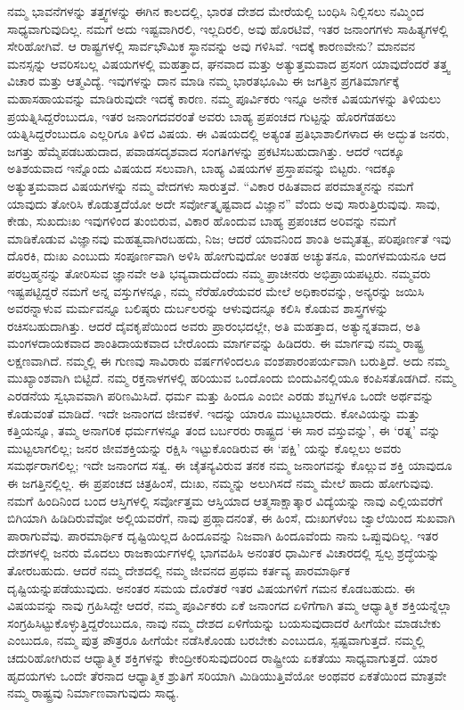 ನಮ್ಮ ಭಾವನೆಗಳನ್ನು ತತ್ತ್ವಗಳನ್ನು ಈಗಿನ ಕಾಲದಲ್ಲಿ, ಭಾರತ ದೇಶದ ಮೇರೆಯಲ್ಲಿ ಬಂಧಿಸಿ ನಿಲ್ಲಿಸಲು ನಮ್ಮಿಂದ ಸಾಧ್ಯವಾಗುವುದಿಲ್ಲ. ನಮಗೆ ಅದು ಇಷ್ಟವಾಗಿರಲಿ, ಇಲ್ಲದಿರಲಿ, ಅವು ಹೊರಟಿವೆ, ಇತರ ಜನಾಂಗಗಳು ಸಾಹಿತ್ಯಗಳಲ್ಲಿ ಸೇರಿಹೋಗಿವೆ. ಆ ರಾಷ್ಟ್ರಗಳಲ್ಲಿ ಸಾರ್ವಭೌಮಿಕ ಸ್ಥಾನವನ್ನು ಅವು ಗಳಿಸಿವೆ. ಇದಕ್ಕೆ ಕಾರಣವೇನು? ಮಾನವನ ಮನಸ್ಸನ್ನು ಆವರಿಸಬಲ್ಲ ವಿಷಯಗಳಲ್ಲಿ ಮಹತ್ತಾದ, ಘನವಾದ ಮತ್ತು ಅತ್ಯುತ್ತಮವಾದ ಪ್ರಸಂಗ ಯಾವುದೆಂದರೆ ತತ್ತ್ವ ವಿಚಾರ ಮತ್ತು ಆತ್ಮವಿದ್ಯೆ. ಇವುಗಳನ್ನು ದಾನ ಮಾಡಿ ನಮ್ಮ ಭಾರತಭೂಮಿ ಈ ಜಗತ್ತಿನ ಪ್ರಗತಿಮಾರ್ಗಕ್ಕೆ ಮಹಾಸಹಾಯವನ್ನು ಮಾಡಿರುವುದೇ ಇದಕ್ಕೆ ಕಾರಣ. ನಮ್ಮ ಪೂರ್ವಿಕರು ಇನ್ನೂ ಅನೇಕ ವಿಷಯಗಳನ್ನು ತಿಳಿಯಲು ಪ್ರಯತ್ನಿಸಿದ್ದರೆಂಬುದೂ, ಇತರ ಜನಾಂಗದವರಂತೆ ಅವರು ಬಾಹ್ಯ ಪ್ರಪಂಚದ ಗುಟ್ಟನ್ನು ಹೊರಗೆಡಹಲು ಯತ್ನಿಸಿದ್ದರೆಂಬುದೂ ಎಲ್ಲರಿಗೂ ತಿಳಿದ ವಿಷಯ. ಈ ವಿಷಯದಲ್ಲಿ ಅತ್ಯಂತ ಪ್ರತಿಭಾಶಾಲಿಗಳಾದ ಈ ಅದ್ಭುತ ಜನರು, ಜಗತ್ತು ಹೆಮ್ಮೆಪಡಬಹುದಾದ, ಪವಾಡ\break ಸದೃಶವಾದ ಸಂಗತಿಗಳನ್ನು ಪ್ರಕಟಿಸಬಹುದಾಗಿತ್ತು. ಆದರೆ ಇದಕ್ಕೂ ಅತಿಶಯವಾದ ಇನ್ನೊಂದು ವಿಷಯದ ಸಲುವಾಗಿ, ಬಾಹ್ಯ ವಿಷಯಗಳ ಪ್ರಸ್ತಾಪವನ್ನು ಬಿಟ್ಟರು. ಇದಕ್ಕೂ ಅತ್ಯುತ್ತಮವಾದ ವಿಷಯಗಳನ್ನು ನಮ್ಮ ವೇದಗಳು ಸಾರುತ್ತವೆ. “ವಿಕಾರ ರಹಿತವಾದ ಪರಮಾತ್ಮನನ್ನು ನಮಗೆ ಯಾವುದು ತೋರಿಸಿ ಕೊಡುತ್ತದೆಯೋ ಅದೇ ಸರ್ವೋತ್ಕೃಷ್ಟವಾದ ವಿಜ್ಞಾನ” ವೆಂದು ಅವು ಸಾರುತ್ತಿರುವುವು. ಸಾವು, ಕೇಡು, ಸುಖದುಃಖ ಇವುಗಳಿಂದ ತುಂಬಿರುವ, ವಿಕಾರ ಹೊಂದುವ ಬಾಹ್ಯ ಪ್ರಪಂಚದ ಅರಿವನ್ನು ನಮಗೆ ಮಾಡಿಕೊಡುವ ವಿಜ್ಞಾನವು ಮಹತ್ವವಾಗಿರಬಹದು, ನಿಜ; ಆದರೆ ಯಾವನಿಂದ ಶಾಂತಿ ಅಮೃತತ್ವ, ಪರಿಪೂರ್ಣತೆ ಇವು ದೊರಕಿ, ದುಃಖ ಎಂಬುದು ಸಂಪೂರ್ಣವಾಗಿ ಅಳಿಸಿ ಹೋಗುವುದೋ ಅಂತಹ ಅಚ್ಯುತನೂ, ಮಂಗಳಮಯನೂ ಆದ ಪರಬ್ರಹ್ಮನನ್ನು ತೋರಿಸುವ ಜ್ಞಾನವೇ ಅತಿ ಭವ್ಯವಾದುದೆಂದು ನಮ್ಮ ಪ್ರಾಚೀನರು ಅಭಿಪ್ರಾಯಪಟ್ಟರು. ನಮ್ಮವರು ಇಷ್ಟಪಟ್ಟಿದ್ದರೆ ನಮಗೆ ಅನ್ನ ವಸ್ತುಗಳನ್ನೂ, ನಮ್ಮ ನೆರೆಹೊರೆಯವರ ಮೇಲೆ ಅಧಿಕಾರವನ್ನು, ಅನ್ಯರನ್ನು ಜಯಿಸಿ ಅವರನ್ನಾಳುವ ಮರ್ಮವನ್ನೂ ಬಲಿಷ್ಠರು ದುರ್ಬಲರನ್ನು ಆಳುವುದನ್ನೂ ಕಲಿಸಿ ಕೊಡುವ ಶಾಸ್ತ್ರಗಳನ್ನು ರಚಿಸಬಹುದಾಗಿತ್ತು. ಆದರೆ ದೈವಕೃಪೆಯಿಂದ ಅವರು ಪ್ರಾರಂಭದಲ್ಲೇ, ಅತಿ ಮಹತ್ತಾದ, ಅತ್ಯುನ್ನತವಾದ, ಅತಿ ಮಂಗಳದಾಯಕವಾದ ಶಾಂತಿದಾಯಕವಾದ ಬೇರೊಂದು ಮಾರ್ಗವನ್ನು ಹಿಡಿದರು. ಈ ಮಾರ್ಗವು ನಮ್ಮ ರಾಷ್ಟ್ರ ಲಕ್ಷಣವಾಗಿದೆ. ನಮ್ಮಲ್ಲಿ ಈ ಗುಣವು ಸಾವಿರಾರು ವರ್ಷಗಳಿಂದಲೂ ವಂಶಪಾರಂಪರ್ಯವಾಗಿ ಬರುತ್ತಿದೆ. ಅದು ನಮ್ಮ ಮುಖ್ಯಾಂಶವಾಗಿ ಬಿಟ್ಟಿದೆ. ನಮ್ಮ ರಕ್ತನಾಳಗಳಲ್ಲಿ ಹರಿಯುವ ಒಂದೊಂದು ಬಿಂದುವಿನಲ್ಲಿಯೂ ಕಂಪಿಸತೊಡಗಿದೆ. ನಮ್ಮ ಎರಡನೆಯ ಸ್ವಭಾವವಾಗಿ ಪರಿಣಮಿಸಿದೆ. ಧರ್ಮ ಮತ್ತು ಹಿಂದೂ ಎಂಬೀ ಎರಡು ಶಬ್ದಗಳೂ ಒಂದೇ ಅರ್ಥವನ್ನು ಕೊಡುವಂತೆ ಮಾಡಿದೆ. ಇದೇ ಜನಾಂಗದ ಜೀವಕಳೆ. ಇದನ್ನು ಯಾರೂ ಮುಟ್ಟಬಾರದು. ಕೋವಿಯನ್ನು ಮತ್ತು ಕತ್ತಿಯನ್ನೂ, ತಮ್ಮ ಅನಾಗರಿಕ ಧರ್ಮಗಳನ್ನೂ ತಂದ ಬರ್ಬರರು ರಾಷ್ಟ್ರದ ‘ಈ ಸಾರ ವಸ್ತುವನ್ನು’, ಈ ‘ರತ್ನ’ ವನ್ನು ಮುಟ್ಟಲಾಗಲಿಲ್ಲ; ಜನರ ಜೀವಶಕ್ತಿಯನ್ನು ರಕ್ಷಿಸಿ ಇಟ್ಟುಕೊಂಡಿರುವ ಈ ‘ಪಕ್ಷಿ’ ಯನ್ನು ಕೊಲ್ಲಲು ಅವರು ಸಮರ್ಥರಾಗಲಿಲ್ಲ; ಇದೇ ಜನಾಂಗದ ಸತ್ವ. ಈ ಚೈತನ್ಯವಿರುವ ತನಕ ನಮ್ಮ ಜನಾಂಗವನ್ನು ಕೊಲ್ಲುವ ಶಕ್ತಿ ಯಾವುದೂ ಈ ಜಗತ್ತಿನಲ್ಲಿಲ್ಲ. ಈ ಪ್ರಪಂಚದ ಚಿತ್ರಹಿಂಸೆ, ದುಃಖ, ನಮ್ಮನ್ನು ಅಲುಗಿಸದೆ ನಮ್ಮ ಮೇಲೆ ಹಾದು ಹೋಗುವುವು. ನಮಗೆ ಹಿಂದಿನಿಂದ ಬಂದ ಆಸ್ತಿಗಳಲ್ಲಿ ಸರ್ವೋತ್ತಮ ಆಸ್ತಿಯಾದ ಆತ್ಮಸಾಕ್ಷಾತ್ಕಾರ ವಿದ್ಯೆಯನ್ನು ನಾವು ಎಲ್ಲಿಯವರೆಗೆ ಬಿಗಿಯಾಗಿ ಹಿಡಿದಿರುವೆವೋ ಅಲ್ಲಿಯವರೆಗೆ, ನಾವು ಪ್ರಹ್ಲಾದನಂತೆ, ಈ ಹಿಂಸೆ, ದುಃಖಗಳೆಂಬ ಜ್ವಾಲೆಯಿಂದ ಸುಖವಾಗಿ ಪಾರಾಗುವೆವು. ಪಾರಮಾರ್ಥಿಕ ದೃಷ್ಟಿಯಿಲ್ಲದ ಹಿಂದೂವನ್ನು ನಿಜವಾಗಿ ಹಿಂದೂವೆಂದು ನಾನು ಒಪ್ಪುವುದಿಲ್ಲ. ಇತರ ದೇಶಗಳಲ್ಲಿ ಜನರು ಮೊದಲು ರಾಜಕಾರ್ಯಗಳಲ್ಲಿ ಭಾಗವಹಿಸಿ ಅನಂತರ ಧಾರ್ಮಿಕ ವಿಚಾರದಲ್ಲಿ ಸ್ವಲ್ಪ ಶ್ರದ್ಧೆಯನ್ನು ತೋರಬಹುದು. ಆದರೆ ನಮ್ಮ ದೇಶದಲ್ಲಿ ನಮ್ಮ ಜೀವನದ ಪ್ರಥಮ ಕರ್ತವ್ಯ ಪಾರಮಾರ್ಥಿಕ ದೃಷ್ಟಿಯನ್ನು\break ಪಡೆಯುವುದು. ಅನಂತರ ಸಮಯ ದೊರೆತರೆ ಇತರ ವಿಷಯಗಳಿಗೆ ಗಮನ ಕೊಡಬಹುದು. ಈ ವಿಷಯವನ್ನು ನಾವು ಗ್ರಹಿಸಿದ್ದೇ ಆದರೆ, ನಮ್ಮ ಪೂರ್ವಿಕರು ಏಕೆ ಜನಾಂಗದ ಏಳಿಗೆಗಾಗಿ ತಮ್ಮ ಆಧ್ಯಾತ್ಮಿಕ ಶಕ್ತಿಯನ್ನೆಲ್ಲಾ ಸಂಗ್ರಹಿಸಿಟ್ಟುಕೊಳ್ಳುತ್ತಿದ್ದರೆಂಬುದೂ, ನಾವು ನಮ್ಮ ದೇಶದ ಏಳಿಗೆಯನ್ನು ಬಯಸುವುದಾದರೆ ಹೀಗೆಯೇ ಮಾಡಬೇಕು ಎಂಬುದೂ, ನಮ್ಮ ಪುತ್ರ ಪೌತ್ರರೂ ಹೀಗೆಯೇ ನಡೆಸಿಕೊಂಡು ಬರಬೇಕು ಎಂಬುದೂ, ಸ್ಪಷ್ಟವಾಗುತ್ತದೆ. ನಮ್ಮಲ್ಲಿ ಚದುರಿಹೋಗಿರುವ ಆಧ್ಯಾತ್ಮಿಕ ಶಕ್ತಿಗಳನ್ನು ಕೇಂದ್ರೀಕರಿಸುವುದರಿಂದ ರಾಷ್ಟ್ರೀಯ ಏಕತೆಯು ಸಾಧ್ಯವಾಗುತ್ತದೆ. ಯಾರ ಹೃದಯಗಳು ಒಂದೇ ತೆರನಾದ ಆಧ್ಯಾತ್ಮಿಕ ಶ್ರುತಿಗೆ ಸರಿಯಾಗಿ ಮಿಡಿಯುತ್ತಿವೆಯೋ ಅಂಥವರ ಏಕತೆಯಿಂದ ಮಾತ್ರವೇ ನಮ್ಮ ರಾಷ್ಟ್ರವು ನಿರ್ಮಾಣವಾಗುವುದು ಸಾಧ್ಯ.

